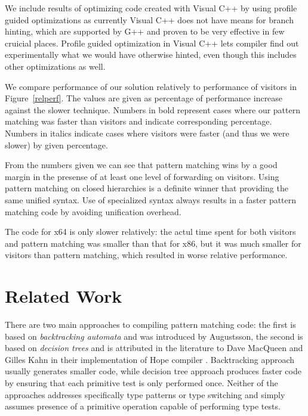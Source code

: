 \documentclass[preprint]{sigplanconf}
\begin{document}
We include results of optimizing code created with Visual C++ by using profile 
guided optimizations as currently Visual C++ does not have means for branch 
hinting, which are supported by G++ and proven to be very effective in few 
cruicial places. Profile guided optimization in Visual C++ lets compiler find 
out experimentally what we would have otherwise hinted, even though this 
includes other optimizations as well.

We compare performance of our solution relatively to performance of visitors in 
Figure~\ref{relperf}. The values are given as percentage of performance increase 
against the slower technique. Numbers in bold represent cases where our pattern 
matching was faster than visitors and indicate corresponding percentage. Numbers 
in italics indicate cases where visitors were faster (and thus we were slower) 
by given percentage.

From the numbers given we can see that pattern matching wins by a good margin in 
the presense of at least one level of forwarding on visitors. Using pattern 
matching on closed hierarchies is a definite winner that providing the same 
unified syntax. Use of specialized syntax always results in a faster pattern 
matching code by avoiding unification overhead.

The code for x64 is only slower relatively: the actul time spent for both 
visitors and pattern matching was smaller than that for x86, but it was much 
smaller for visitors than pattern matching, which resulted in worse relative 
performance.

\section{Related Work} %
\label{sec:rw}

There are two main approaches to compiling pattern matching code: the first is 
based on \emph{backtracking automata} and was introduced by Augustsson\cite{}, 
the second is based on \emph{decision trees} and is attributed in the literature 
to Dave MacQueen and Gilles Kahn in their implementation of Hope compiler \cite{}.
Backtracking approach usually generates smaller code, while decision tree 
approach produces faster code by ensuring that each primitive test is only 
performed once. Neither of the approaches addresses specifically type patterns 
or type switching and simply assumes presence of a primitive operation capable 
of performing type tests.
\end{document}
